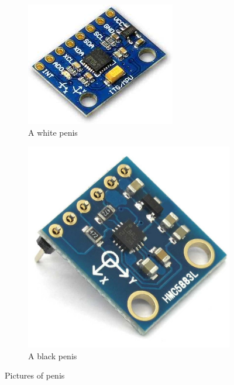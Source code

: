 \documentclass[10pt,a4paper]{article}
\begin{document}
\begin{figure}[h]
    \centering
    \begin{subfigure}[b]{0.3\textwidth}
        \includegraphics[height=0.75\textwidth]{MPU-6050.jpg}
        \caption{A white penis}
        \label{fig:gull}
    \end{subfigure} 
    \begin{subfigure}[b]{0.3\textwidth}
        \includegraphics[height=0.75\textwidth]{HMC5883L.jpg}
        \caption{A black penis}
        \label{fig:tiger}
    \end{subfigure}
    \caption{Pictures of penis}\label{fig:animals}
\end{figure}
\end{document}
